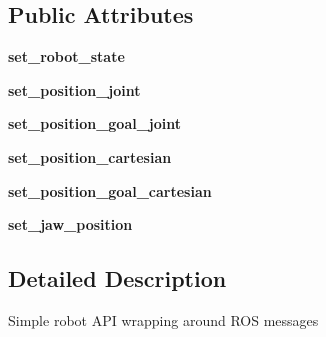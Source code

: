 \subsection*{Public Attributes}
\begin{DoxyCompactItemize}
\item 
\hypertarget{classrobot_1_1robot_ad698c604b6b8318976849b9a44e4f775}{{\bfseries set\-\_\-robot\-\_\-state}}\label{classrobot_1_1robot_ad698c604b6b8318976849b9a44e4f775}

\item 
\hypertarget{classrobot_1_1robot_a604b77e634cb6390e1de61ce74ccbd94}{{\bfseries set\-\_\-position\-\_\-joint}}\label{classrobot_1_1robot_a604b77e634cb6390e1de61ce74ccbd94}

\item 
\hypertarget{classrobot_1_1robot_aa07a50d20eb6ae8f87f16ba2e5b5ec9f}{{\bfseries set\-\_\-position\-\_\-goal\-\_\-joint}}\label{classrobot_1_1robot_aa07a50d20eb6ae8f87f16ba2e5b5ec9f}

\item 
\hypertarget{classrobot_1_1robot_a1b4faee5ddf60a680f6db7dd60de34aa}{{\bfseries set\-\_\-position\-\_\-cartesian}}\label{classrobot_1_1robot_a1b4faee5ddf60a680f6db7dd60de34aa}

\item 
\hypertarget{classrobot_1_1robot_a904fcdae041ae610dd619ca4ce9d1c5a}{{\bfseries set\-\_\-position\-\_\-goal\-\_\-cartesian}}\label{classrobot_1_1robot_a904fcdae041ae610dd619ca4ce9d1c5a}

\item 
\hypertarget{classrobot_1_1robot_ae7c8300b89e37f05be231dc4201a3312}{{\bfseries set\-\_\-jaw\-\_\-position}}\label{classrobot_1_1robot_ae7c8300b89e37f05be231dc4201a3312}

\end{DoxyCompactItemize}


\subsection{Detailed Description}
\begin{DoxyVerb}Simple robot API wrapping around ROS messages
\end{DoxyVerb}
 

